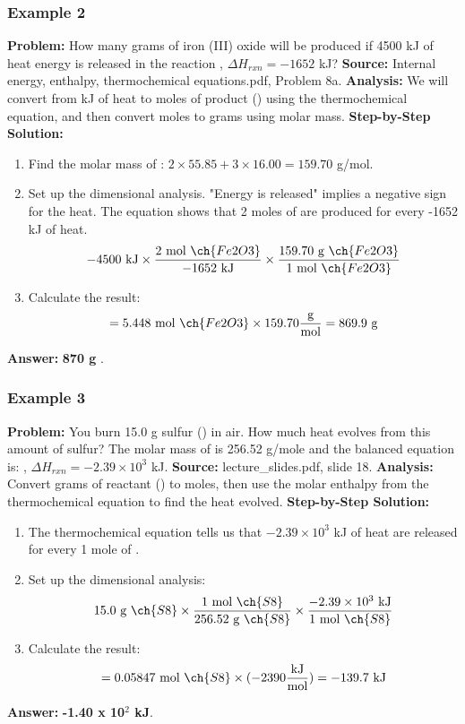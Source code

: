 \documentclass{article}
\begin{document}
\subsubsection{Example 2}
\textbf{Problem:} How many grams of iron (III) oxide will be produced if 4500 kJ of heat energy is released in the reaction , $\Delta H_{rxn} = -1652$ kJ?
\textbf{Source:} Internal energy, enthalpy, thermochemical equations.pdf, Problem 8a.
\textbf{Analysis:} We will convert from kJ of heat to moles of product () using the thermochemical equation, and then convert moles to grams using molar mass.
\textbf{Step-by-Step Solution:}
\begin{enumerate}
    \item Find the molar mass of : $2 \times 55.85 + 3 \times 16.00 = 159.70$ g/mol.
    \item Set up the dimensional analysis. "Energy is released" implies a negative sign for the heat. The equation shows that 2 moles of  are produced for every -1652 kJ of heat.
    \[ -4500 \text{ kJ} \times \frac{2 \text{ mol } \ch{Fe2O3}}{-1652 \text{ kJ}} \times \frac{159.70 \text{ g } \ch{Fe2O3}}{1 \text{ mol } \ch{Fe2O3}} \]
    \item Calculate the result:
    \[ = 5.448 \text{ mol } \ch{Fe2O3} \times 159.70 \frac{\text{g}}{\text{mol}} = 869.9 \text{ g} \]
\end{enumerate}
\textbf{Answer:} \textbf{870 g }.

\subsubsection{Example 3}
\textbf{Problem:} You burn 15.0 g sulfur () in air. How much heat evolves from this amount of sulfur? The molar mass of  is 256.52 g/mole and the balanced equation is: , $\Delta H_{rxn} = -2.39 \times 10^3$ kJ.
\textbf{Source:} lecture\_slides.pdf, slide 18.
\textbf{Analysis:} Convert grams of reactant () to moles, then use the molar enthalpy from the thermochemical equation to find the heat evolved.
\textbf{Step-by-Step Solution:}
\begin{enumerate}
    \item The thermochemical equation tells us that $-2.39 \times 10^3$ kJ of heat are released for every 1 mole of .
    \item Set up the dimensional analysis:
    \[ 15.0 \text{ g } \ch{S8} \times \frac{1 \text{ mol } \ch{S8}}{256.52 \text{ g } \ch{S8}} \times \frac{-2.39 \times 10^3 \text{ kJ}}{1 \text{ mol } \ch{S8}} \]
    \item Calculate the result:
    \[ = 0.05847 \text{ mol } \ch{S8} \times (-2390 \frac{\text{kJ}}{\text{mol}}) = -139.7 \text{ kJ} \]
\end{enumerate}
\textbf{Answer:} \textbf{-1.40 x 10$^2$ kJ}.
\end{document}
